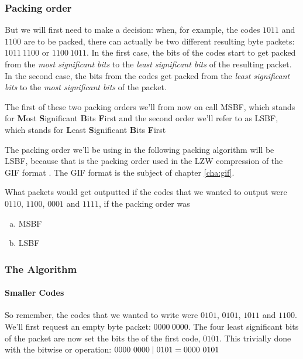 \subsubsection{Packing order}

But we will first need to make a decision: when, for example, the
codes $1011$ and $1100$ are to be packed, there can actually be two
different resulting byte packets: $1011\ 1100$ or $1100\ 1011$. In the
first case, the bits of the codes start to get packed from the
\textit{most significant bits} to the \textit{least significant bits}
of the resulting packet. In the second case, the bits from the codes
get packed from the \textit{least significant bits} to the
\textit{most significant bits} of the packet.

The first of these two packing orders we'll from now on call
MSBF, which stands for \textbf{M}ost \textbf{S}ignificant
\textbf{B}its \textbf{F}irst and the second order we'll refer to as
LSBF, which stands for \textbf{L}east \textbf{S}ignificant
\textbf{B}its \textbf{F}irst

The packing order we'll be using in the following packing algorithm
will be LSBF, because that is the packing order used in the LZW
compression of the GIF format \cite{gif89a}. The GIF format is the
subject of chapter \ref{cha:gif}.

\begin{Exercise}[label={bit-packing-order}]

  What packets would get outputted if the codes that we wanted to
  output were $0110$, $1100$, $0001$ and $1111$, if the packing order
  was

  \begin{enumerate}[(a)]
  \item MSBF
  \item LSBF
  \end{enumerate}

\end{Exercise}

\subsubsection{The Algorithm}

\paragraph{Smaller Codes}

So remember, the codes that we wanted to write were $0101$, $0101$,
$1011$ and $1100$. We'll first request an empty byte packet: $0000\
0000$. The four least significant bits of the packet are now set the
bits the of the first code, $0101$. This trivially done with the
bitwise or operation: $0000\ 0000 \mathrel{|} 0101 = 0000\ 0101$

